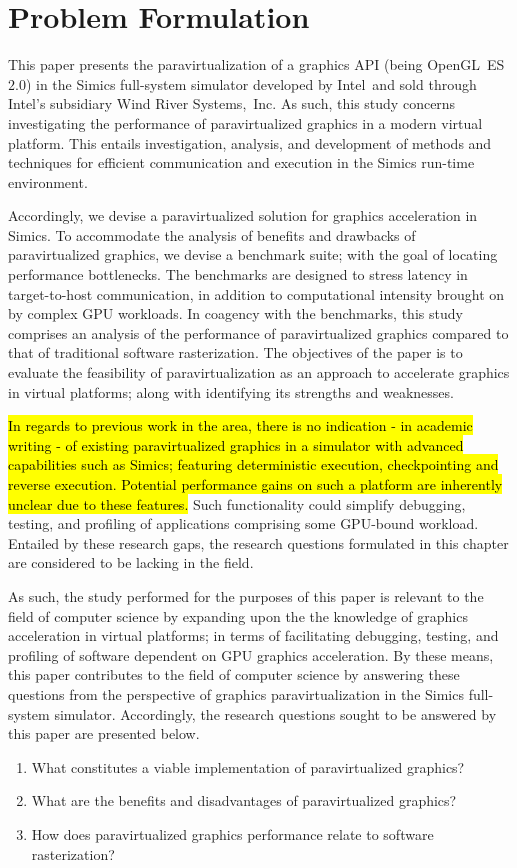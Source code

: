 
\section{Problem Formulation}
\label{sec:problemformulation}
This paper presents the paravirtualization of a graphics API (being OpenGL~ES~$2.0$) in the Simics full-system simulator developed by Intel\circledR\ and sold through Intel\circledR 's subsidiary Wind River Systems,~Inc. 
As such, this study concerns investigating the performance of paravirtualized graphics in a modern virtual platform.
This entails investigation, analysis, and development of methods and techniques for efficient communication and execution in the Simics run-time environment.

Accordingly, we devise a paravirtualized solution for graphics acceleration in Simics.
To accommodate the analysis of benefits and drawbacks of paravirtualized graphics, we devise a benchmark suite; with the goal of locating performance bottlenecks.
The benchmarks are designed to stress latency in target-to-host communication, in addition to computational intensity brought on by complex GPU workloads.
In coagency with the benchmarks, this study comprises an analysis of the performance of paravirtualized graphics compared to that of traditional software rasterization.
The objectives of the paper is to evaluate the feasibility of paravirtualization as an approach to accelerate graphics in virtual platforms; along with identifying its strengths and weaknesses.

\hl{In regards to previous work in the area, there is no indication - in academic writing - of existing paravirtualized graphics in a simulator with advanced capabilities such as Simics; featuring deterministic execution, checkpointing and reverse execution.
Potential performance gains on such a platform are inherently unclear due to these features.}
Such functionality could simplify debugging, testing, and profiling of applications comprising some GPU-bound workload.
Entailed by these research gaps, the research questions formulated in this chapter are considered to be lacking in the field.

As such, the study performed for the purposes of this paper is relevant to the field of computer science by expanding upon the the knowledge of graphics acceleration in virtual platforms; in terms of facilitating debugging, testing, and profiling of software dependent on GPU graphics acceleration.
By these means, this paper contributes to the field of computer science by answering these questions from the perspective of graphics paravirtualization in the Simics full-system simulator.
Accordingly, the research questions sought to be answered by this paper are presented below.

\begin{enumerate}
  \item What constitutes a viable implementation of paravirtualized graphics?
  \item What are the benefits and disadvantages of paravirtualized graphics?
  \item How does paravirtualized graphics performance relate to software rasterization?
\end{enumerate}
